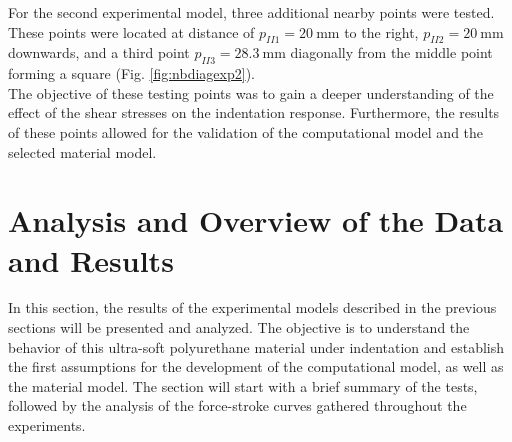 For the second experimental model, three additional nearby points were tested. 
These points were located at distance of $p_{II1} = \SI{20}{\milli \m}$ to the 
right, $p_{II2} = \SI{20}{\milli \m}$ downwards, and a third point $p_{II3} = \SI{28.3}{\milli \m}$ 
diagonally from the middle point forming a square (Fig. \ref{fig:nbdiagexp2}). \\

The objective of these testing points was to gain a deeper understanding of the effect of 
the shear stresses on the indentation response. Furthermore, 
the results of these points allowed for the validation of the 
computational model and the selected material model.




\section{Analysis and Overview of the Data and Results}
\label{section:expresult}

In this section, the results of the experimental models described in the previous 
sections will be presented and analyzed. The objective is to understand the behavior 
of this ultra-soft polyurethane material under indentation and establish the first 
assumptions for the development of the computational model, as well as the material model.
The section will start with a brief summary of the tests, followed by the analysis of the 
force-stroke curves gathered throughout the experiments.

